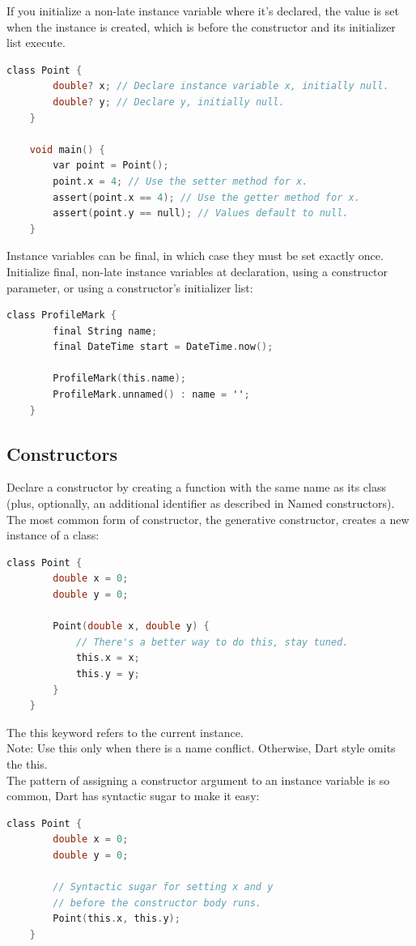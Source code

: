 If you initialize a non-late instance variable where it's declared, the value is set when the instance is created, which is before the constructor and its initializer list execute.

\begin{lstlisting}[language=C]
	class Point {
		double? x; // Declare instance variable x, initially null.
		double? y; // Declare y, initially null.
	}
	
	void main() {
		var point = Point();
		point.x = 4; // Use the setter method for x.
		assert(point.x == 4); // Use the getter method for x.
		assert(point.y == null); // Values default to null.
	}
\end{lstlisting}
Instance variables can be final, in which case they must be set exactly once. Initialize final, non-late instance variables at declaration, using a constructor parameter, or using a constructor's initializer list:

\begin{lstlisting}[language=C]
	class ProfileMark {
		final String name;
		final DateTime start = DateTime.now();
		
		ProfileMark(this.name);
		ProfileMark.unnamed() : name = '';
	}
\end{lstlisting}
\subsection{Constructors}
Declare a constructor by creating a function with the same name as its class (plus, optionally, an additional identifier as described in Named constructors). The most common form of constructor, the generative constructor, creates a new instance of a class:
\begin{lstlisting}[language=C]
	class Point {
		double x = 0;
		double y = 0;
		
		Point(double x, double y) {
			// There's a better way to do this, stay tuned.
			this.x = x;
			this.y = y;
		}
	}
\end{lstlisting}
The this keyword refers to the current instance.\\
 Note: Use this only when there is a name conflict. Otherwise, Dart style omits the this.\\
The pattern of assigning a constructor argument to an instance variable is so common, Dart has syntactic sugar to make it easy:
\begin{lstlisting}[language=C]
	class Point {
		double x = 0;
		double y = 0;
		
		// Syntactic sugar for setting x and y
		// before the constructor body runs.
		Point(this.x, this.y);
	}
\end{lstlisting}
